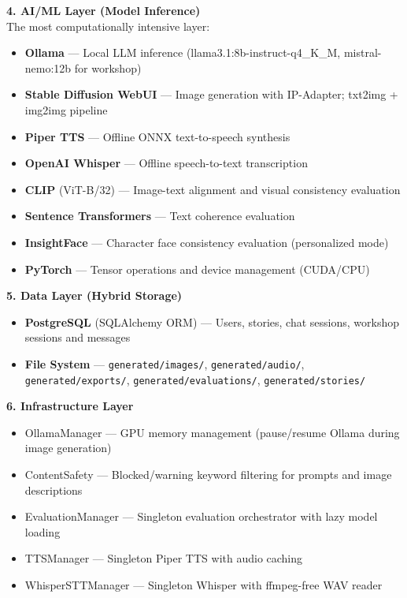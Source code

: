 \textbf{4. AI/ML Layer (Model Inference)} \\
The most computationally intensive layer:
\begin{itemize}
    \item \textbf{Ollama} — Local LLM inference (llama3.1:8b-instruct-q4\_K\_M, mistral-nemo:12b for workshop)
    \item \textbf{Stable Diffusion WebUI} — Image generation with IP-Adapter; txt2img + img2img pipeline
    \item \textbf{Piper TTS} — Offline ONNX text-to-speech synthesis
    \item \textbf{OpenAI Whisper} — Offline speech-to-text transcription
    \item \textbf{CLIP} (ViT-B/32) — Image-text alignment and visual consistency evaluation
    \item \textbf{Sentence Transformers} — Text coherence evaluation
    \item \textbf{InsightFace} — Character face consistency evaluation (personalized mode)
    \item \textbf{PyTorch} — Tensor operations and device management (CUDA/CPU)
\end{itemize}

\textbf{5. Data Layer (Hybrid Storage)} \\
\begin{itemize}
    \item \textbf{PostgreSQL} (SQLAlchemy ORM) — Users, stories, chat sessions, workshop sessions and messages
    \item \textbf{File System} — \texttt{generated/images/}, \texttt{generated/audio/}, \texttt{generated/exports/}, \texttt{generated/evaluations/}, \texttt{generated/stories/}
\end{itemize}

\textbf{6. Infrastructure Layer} \\
\begin{itemize}
    \item OllamaManager — GPU memory management (pause/resume Ollama during image generation)
    \item ContentSafety — Blocked/warning keyword filtering for prompts and image descriptions
    \item EvaluationManager — Singleton evaluation orchestrator with lazy model loading
    \item TTSManager — Singleton Piper TTS with audio caching
    \item WhisperSTTManager — Singleton Whisper with ffmpeg-free WAV reader
\end{itemize}

